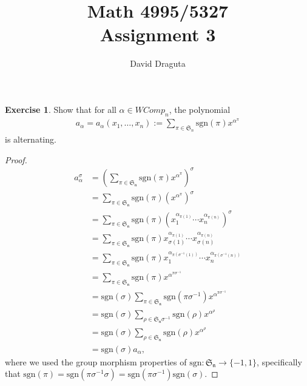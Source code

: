 \documentclass[12pt]{extarticle}
\title{ Math 4995/5327
  \\
  Assignment 3}
\author{David Draguta}
\newcommand{\set}[1]{\{#1\}}
\newcommand{\sgn}{\text{sgn}}
\newcommand{\<}{\langle}
\renewcommand{\>}{\rangle}
\theoremstyle{definition}
\newtheorem{exercise}{Exercise}
\begin{document}
\maketitle

\begin{exercise}
  Show that for all $\alpha \in WComp_n$, the polynomial
  \begin{align*}
    a_{\alpha} = a_{\alpha}(x_1, \dots, x_n) := \sum\limits_{\pi \in \mathfrak{S}_n} \sgn(\pi) x^{\alpha^{\pi}}
  \end{align*}
  is alternating.
\end{exercise}
\begin{proof}
  \begin{align*}
    a_{\alpha}^{\sigma}
    &= (\sum\limits_{\pi \in \mathfrak{S_n}} \sgn(\pi) x^{\alpha^{\pi}})^{\sigma} \\ 
    &= \sum\limits_{\pi \in \mathfrak{S_n}} \sgn(\pi) (x^{\alpha^{\pi}})^{\sigma} \\
    &= \sum\limits_{\pi \in \mathfrak{S_n}} \sgn(\pi) (x_1^{\alpha_{\pi(1)}} \cdots x_n^{\alpha_{\pi(n)}})^{\sigma} \\
    &= \sum\limits_{\pi \in \mathfrak{S_n}} \sgn(\pi) x_{\sigma(1)}^{\alpha_{\pi(1)}} \cdots x_{\sigma(n)}^{\alpha_{\pi(n)}} \\
    &= \sum\limits_{\pi \in \mathfrak{S_n}} \sgn(\pi) x_{1}^{\alpha_{\pi(\sigma^{-1}(1))}} \cdots x_{n}^{\alpha_{\pi(\sigma^{-1}(n))}} \\
    &= \sum\limits_{\pi \in \mathfrak{S_n}} \sgn(\pi) x^{\alpha^{\pi\sigma^{-1}}} \\
    &= \sgn(\sigma)\sum\limits_{\pi \in \mathfrak{S_n}} \sgn(\pi\sigma^{-1}) x^{\alpha^{\pi\sigma^{-1}}} \\
    &= \sgn(\sigma)\sum\limits_{\rho \in \mathfrak{S_n}\sigma^{-1}} \sgn(\rho) x^{\alpha^{\rho}} \\
    &= \sgn(\sigma)\sum\limits_{\rho \in \mathfrak{S_n}} \sgn(\rho) x^{\alpha^{\rho}} \\
    &= \sgn(\sigma)a_{\alpha},
  \end{align*}
  where we used the group morphism properties of $\sgn: \mathfrak{S_n} \to \set{-1,1}$, specifically that
  $\sgn(\pi) = \sgn(\pi \sigma^{-1} \sigma) = \sgn(\pi \sigma^{-1}) \sgn(\sigma)$.
\end{proof}
\end{document}
